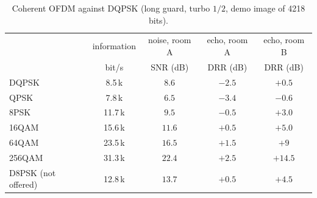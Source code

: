 \documentclass[11pt,a4paper]{article}
\theoremstyle{remark}
\begin{document}
\begin{table}[ht]
\centering
\caption{Coherent OFDM against DQPSK (long guard, turbo $1/2$, demo image of 4218 bits).}
\label{tab:cohres}
\small
\begin{tabular}{lcccc}
\toprule
& information & noise, room A & echo, room A & echo, room B\\
& bit/s & SNR (dB) & DRR (dB) & DRR (dB)\\
\midrule
DQPSK & 8.5\,k & $8.6$ & $-2.5$ & $+0.5$\\
QPSK & 7.8\,k & $6.5$ & $-3.4$ & $-0.6$\\
8PSK & 11.7\,k & $9.5$ & $-0.5$ & $+3.0$\\
16QAM & 15.6\,k & $11.6$ & $+0.5$ & $+5.0$\\
64QAM & 23.5\,k & $16.5$ & $+1.5$ & $+9$\\
256QAM & 31.3\,k & $22.4$ & $+2.5$ & $+14.5$\\
D8PSK (not offered) & 12.8\,k & $13.7$ & $+0.5$ & $+4.5$\\
\bottomrule
\end{tabular}
\end{table}
\end{document}
